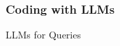 \begin{frame}
    \frametitle{Coding with LLMs}
    
    \begin{figure}
       \centering
    \end{figure}

\end{frame}

\begin{frame}{LLMs for Queries}
    
    \begin{figure}
       \centering
    \end{figure}

\end{frame}



